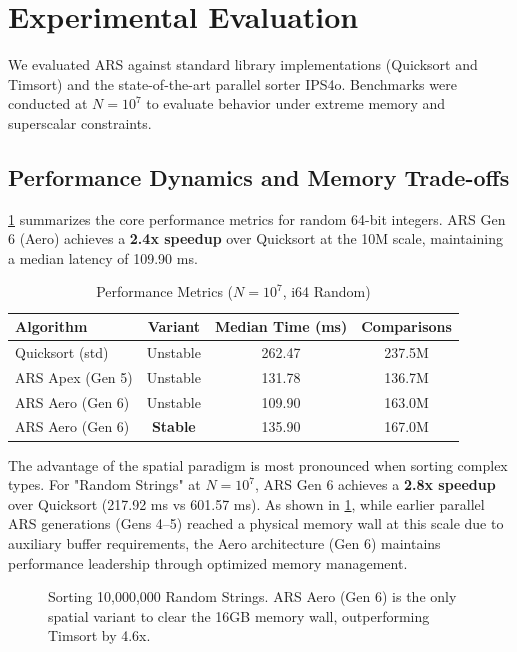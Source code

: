 \section{Experimental Evaluation} \label{sec:evaluation}
We evaluated ARS against standard library implementations (Quicksort and Timsort) and the state-of-the-art parallel sorter IPS4o. Benchmarks were conducted at $N=10^7$ to evaluate behavior under extreme memory and superscalar constraints.

\subsection{Performance Dynamics and Memory Trade-offs}
\cref{tab:metrics} summarizes the core performance metrics for random 64-bit integers. ARS Gen 6 (Aero) achieves a \textbf{2.4x speedup} over Quicksort at the 10M scale, maintaining a median latency of 109.90 ms.

\begin{table}[h]
\caption{Performance Metrics ($N=10^7$, i64 Random)}
\label{tab:metrics}
\centering
\begin{tabular}{lccc}
\toprule
Algorithm & Variant & Median Time (ms) & Comparisons \\
\midrule
Quicksort (std) & Unstable & 262.47 & 237.5M \\
ARS Apex (Gen 5) & Unstable & 131.78 & 136.7M \\
ARS Aero (Gen 6) & Unstable & 109.90 & 163.0M \\
ARS Aero (Gen 6) & \textbf{Stable} & 135.90 & 167.0M \\
\bottomrule
\end{tabular}
\end{table}

The advantage of the spatial paradigm is most pronounced when sorting complex types. For "Random Strings" at $N=10^7$, ARS Gen 6 achieves a \textbf{2.8x speedup} over Quicksort (217.92 ms vs 601.57 ms). As shown in \cref{fig:strings}, while earlier parallel ARS generations (Gens 4--5) reached a physical memory wall at this scale due to auxiliary buffer requirements, the Aero architecture (Gen 6) maintains performance leadership through optimized memory management.

\begin{figure}[htbp]
\centering
{}
\caption{Sorting 10,000,000 Random Strings. ARS Aero (Gen 6) is the only spatial variant to clear the 16GB memory wall, outperforming Timsort by 4.6x.}
\label{fig:strings}
\end{figure}

